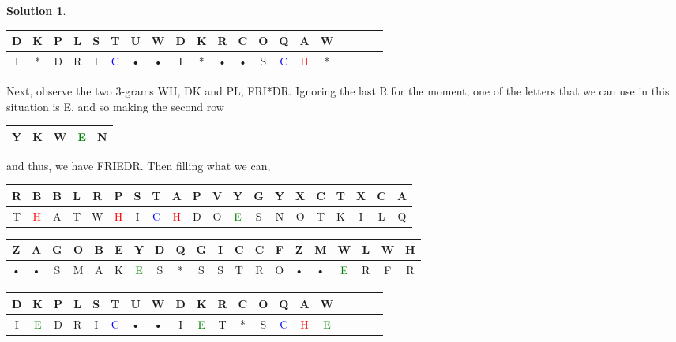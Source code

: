 \documentclass[11pt]{article}
\theoremstyle{definition}\newtheorem{definition}{Definition}
\theoremstyle{definition}\newtheorem{question}{Question}
\theoremstyle{definition}\newtheorem*{solution}{Solution}
\begin{document}
\begin{solution}
\begin{center}
        \begin{tabular}{|cc|cc|cc|cc|cc|cc|cc|cc|cc|cc|} \hline
            D & K & P & L & S & T & U & W & D & K & R & C & O & Q & A & W \\ \hline
            I & * & D & R & I & \textcolor{blue}{C} & • & • & I & * & • & • & S & \textcolor{blue}{C} & \textcolor{red}{H} & * \\ \hline
        \end{tabular}
    \end{center}

    Next, observe the two 3-grams WH, DK and PL, FRI*DR. Ignoring the last R for the moment, one of the letters that we can use in this situation is E, and so making the second row
    \begin{center}
        \begin{tabular}{|c|c|c|c|c|} \hline
            Y & K & W & \textcolor{green}{E} & N \\ \hline
        \end{tabular}
    \end{center}
    and thus, we have FRIEDR. Then filling what we can,
    \begin{center}
        \begin{tabular}{|cc|cc|cc|cc|cc|cc|cc|cc|cc|cc|} \hline
            R & B & B & L & R & P & S & T & A & P & V & Y & G & Y & X & C & T & X & C & A \\ \hline
            T & \textcolor{red}{H} & A & T & W & \textcolor{red}{H} & I & \textcolor{blue}{C} & \textcolor{red}{H} & D & O & \textcolor{green}{E} & S & N & O & T & K & I & L & Q \\ \hline
        \end{tabular}

        \begin{tabular}{|cc|cc|cc|cc|cc|cc|cc|cc|cc|cc|} \hline
            Z & A & G & O & B & E & Y & D & Q & G & I & C & C & F & Z & M & W & L & W & H \\ \hline
            • & • & S & M & A & K & \textcolor{green}{E} & S & * & S & S & T & R & O & • & • & \textcolor{green}{E} & R & F & R \\ \hline
        \end{tabular}

        \begin{tabular}{|cc|cc|cc|cc|cc|cc|cc|cc|cc|cc|} \hline
            D & K & P & L & S & T & U & W & D & K & R & C & O & Q & A & W \\ \hline
            I & \textcolor{green}{E} & D & R & I & \textcolor{blue}{C} & • & • & I & \textcolor{green}{E} & T & * & S & \textcolor{blue}{C} & \textcolor{red}{H} & \textcolor{green}{E} \\ \hline
        \end{tabular}
    \end{center}


\end{solution}
\end{document}
